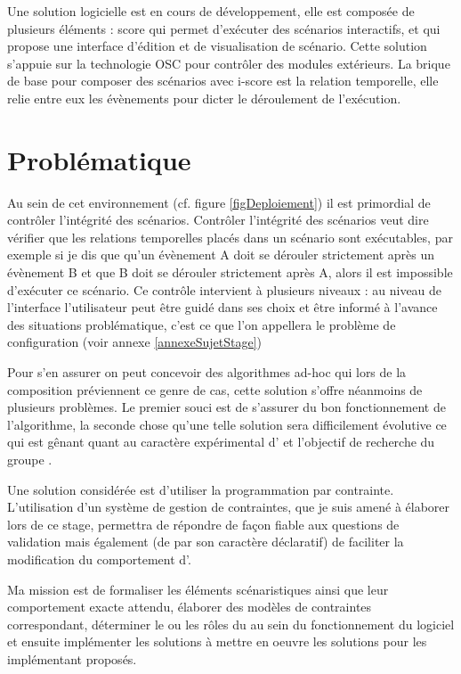 Une solution logicielle est en cours de développement, elle est composée de plusieurs éléments : score qui permet d'exécuter des scénarios interactifs, et \iscore{} qui propose une interface d'édition et de visualisation de scénario. Cette solution s'appuie sur la technologie OSC pour contrôler des modules extérieurs. La brique de base pour composer des scénarios avec i-score est la relation temporelle, elle relie entre eux les évènements pour dicter le déroulement de l'exécution.



\section*{Problématique}

Au sein de cet environnement (cf. figure \ref{figDeploiement}) il est primordial de contrôler l'intégrité des scénarios. Contrôler l'intégrité des scénarios veut dire vérifier que les relations temporelles placés dans un scénario sont exécutables, par exemple si je dis que qu'un évènement A doit se dérouler strictement après un évènement B et que B doit se dérouler strictement après A, alors il est impossible d'exécuter ce scénario.
Ce contrôle intervient à plusieurs niveaux : au niveau de l'interface l'utilisateur peut être guidé dans ses choix et être informé à l'avance des situations problématique, c'est ce que l'on appellera le problème de configuration (voir annexe \ref{annexeSujetStage})

Pour s'en assurer on peut concevoir des algorithmes ad-hoc qui lors de la composition préviennent ce genre de cas, cette solution s'offre néanmoins de plusieurs problèmes. Le premier souci est de s'assurer du bon fonctionnement de l'algorithme, la seconde chose qu'une telle solution sera difficilement évolutive ce qui est gênant quant au caractère expérimental d'\iscore{} et l'objectif de recherche du groupe \ossia{}.



Une solution considérée est d'utiliser la programmation par contrainte. L'utilisation d'un système de gestion de contraintes, que je suis amené à élaborer lors de ce stage, permettra de répondre de façon fiable aux questions de validation mais également (de par son caractère déclaratif) de faciliter la modification du comportement d'\iscore{}.

Ma mission est de formaliser les éléments scénaristiques ainsi que leur comportement exacte attendu, élaborer des modèles de contraintes correspondant, déterminer le ou les rôles du \csp{} au sein du fonctionnement du logiciel et ensuite implémenter les solutions à mettre en oeuvre les solutions pour les implémentant proposés.

